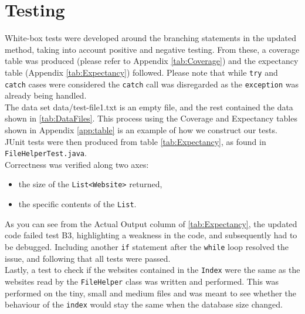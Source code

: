 \section{Testing}
White-box tests were developed around the branching statements in the updated method, taking into account positive and negative testing. From these, a coverage table was produced (please refer to Appendix \ref{tab:Coverage}) and the expectancy table (Appendix \ref{tab:Expectancy}) followed. Please note that while {\tt try} and {\tt catch} cases were considered the {\tt catch} call was disregarded as the {\tt exception} was already being handled.\\
The data set data/test-file1.txt is an empty file, and the rest contained the data shown in \ref{tab:DataFiles}. This process using the Coverage and Expectancy tables shown in Appendix \ref{app:table} is an example of how we construct our tests. JUnit tests were then produced from table \ref{tab:Expectancy}, as found in {\tt FileHelperTest.java}.\\
Correctness was verified along two axes:
\begin{itemize}
    \item the size of the {\tt List<Website>} returned,
    \item the specific contents of the {\tt List}.
\end{itemize}
As you can see from the Actual Output column of \ref{tab:Expectancy}, the updated code failed test B3, highlighting a weakness in the code, and subsequently had to be debugged. Including another {\tt if} statement after the {\tt while} loop resolved the issue, and following that all tests were passed.\\
Lastly, a test to check if the websites contained in the {\tt Index} were the same as the websites read by the {\tt FileHelper} class was written and performed. This was performed on the tiny, small and medium files and was meant to see whether the behaviour of the {\tt index} would stay the same when the database size changed.